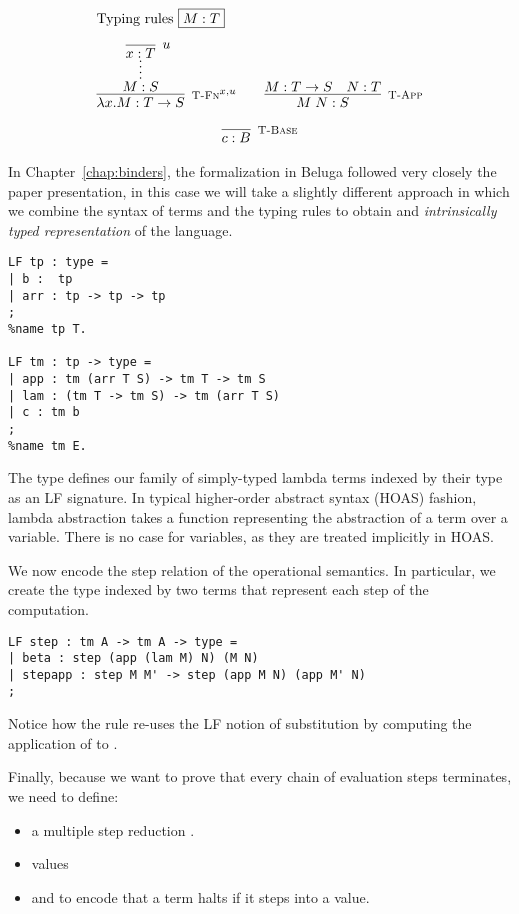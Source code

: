 \[
\begin{array}{c@{\qquad}c}
\multicolumn{2}{l}{\mbox{Typing rules \fbox{$M:T$}}} \\[1em]
\infer[\TFn^{x,u}]{\lam x.M : T \arrow S}
                 {\infer*{M:S}{\infer[u]{x:T}{}}} &
\infer[\TApp]{M\;N : S}{M : T \arrow S & N:T} \\[1em]
\multicolumn{2}{c}{\infer[\TBase]{c : B}{}}
\end{array}
\]

In Chapter~\ref{chap:binders}, the formalization in Beluga followed
very closely the paper presentation, in this case we will take a
slightly different approach in which we combine the syntax of terms
and the typing rules to obtain and \emph{intrinsically typed
  representation} of the language.

\begin{lstlisting}
LF tp : type =
| b :  tp
| arr : tp -> tp -> tp
;
%name tp T.

LF tm : tp -> type =
| app : tm (arr T S) -> tm T -> tm S
| lam : (tm T -> tm S) -> tm (arr T S)
| c : tm b
;
%name tm E.
\end{lstlisting}

The type  defines our family of simply-typed lambda terms
indexed by their type as an LF signature. In typical higher-order
abstract syntax (HOAS) fashion, lambda abstraction takes a function
representing the abstraction of a term over a variable. There is no
case for variables, as they are treated implicitly in HOAS.

We now encode the step relation of the operational semantics. In
particular, we create the  type indexed by two terms that
represent each step of the computation.

\begin{lstlisting}
LF step : tm A -> tm A -> type =
| beta : step (app (lam M) N) (M N)
| stepapp : step M M' -> step (app M N) (app M' N)
;
\end{lstlisting}

Notice how the  rule re-uses the LF notion of substitution by
computing the application of  to .

Finally, because we want to prove that every chain of evaluation steps
terminates, we need to define:
\begin{itemize}
\item a multiple step reduction .
\item values 
\item and  to encode that a term halts if it steps into a value.
\end{itemize}


